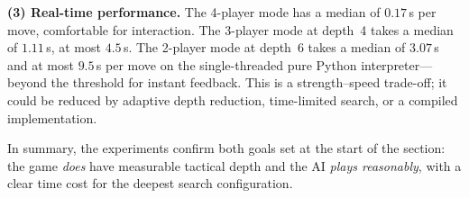 \textbf{(3) Real-time performance.} The 4-player mode has a median of
$0.17$\,s per move, comfortable for interaction. The 3-player mode at
depth~4 takes a median of $1.11$\,s, at most $4.5$\,s. The 2-player mode at
depth~6 takes a median of $3.07$\,s and at most $9.5$\,s per move on the
single-threaded pure Python interpreter---beyond the threshold for instant
feedback. This is a strength--speed trade-off; it could be reduced by
adaptive depth reduction, time-limited search, or a compiled
implementation.

In summary, the experiments confirm both goals set at the start of the
section: the game \emph{does} have measurable tactical depth and the AI
\emph{plays reasonably}, with a clear time cost for the deepest search
configuration.
